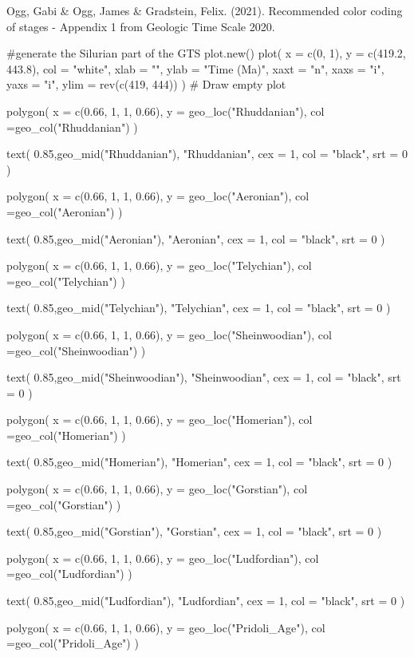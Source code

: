 \documentclass[a4paper]{book}
\begin{document}
%
\begin{References}
Ogg, Gabi \& Ogg, James \& Gradstein, Felix. (2021).
Recommended color coding of stages - Appendix 1
from Geologic Time Scale 2020.
\end{References}
%
\begin{Examples}
\begin{ExampleCode}
#generate the Silurian part of the GTS
plot.new()
plot(
 x = c(0, 1),
 y = c(419.2, 443.8),
 col = "white",
 xlab = "",
 ylab = "Time (Ma)",
 xaxt = "n",
 xaxs = "i",
 yaxs = "i",
 ylim = rev(c(419, 444))
)            # Draw empty plot

polygon(
 x = c(0.66, 1, 1, 0.66),
 y = geo_loc("Rhuddanian"),
 col =geo_col("Rhuddanian")
)

text(
 0.85,geo_mid("Rhuddanian"),
 "Rhuddanian",
 cex = 1,
 col = "black",
 srt = 0
)

polygon(
 x = c(0.66, 1, 1, 0.66),
 y = geo_loc("Aeronian"),
 col =geo_col("Aeronian")
)

text(
 0.85,geo_mid("Aeronian"),
 "Aeronian",
 cex = 1,
 col = "black",
 srt = 0
)

polygon(
 x = c(0.66, 1, 1, 0.66),
 y = geo_loc("Telychian"),
 col =geo_col("Telychian")
)

text(
 0.85,geo_mid("Telychian"),
 "Telychian",
 cex = 1,
 col = "black",
 srt = 0
)

polygon(
 x = c(0.66, 1, 1, 0.66),
 y = geo_loc("Sheinwoodian"),
 col =geo_col("Sheinwoodian")
)

text(
 0.85,geo_mid("Sheinwoodian"),
 "Sheinwoodian",
 cex = 1,
 col = "black",
 srt = 0
)


polygon(
 x = c(0.66, 1, 1, 0.66),
 y = geo_loc("Homerian"),
 col =geo_col("Homerian")
)

text(
 0.85,geo_mid("Homerian"),
 "Homerian",
 cex = 1,
 col = "black",
 srt = 0
)


polygon(
 x = c(0.66, 1, 1, 0.66),
 y = geo_loc("Gorstian"),
 col =geo_col("Gorstian")
)

text(
 0.85,geo_mid("Gorstian"),
 "Gorstian",
 cex = 1,
 col = "black",
 srt = 0
)

polygon(
 x = c(0.66, 1, 1, 0.66),
 y = geo_loc("Ludfordian"),
 col =geo_col("Ludfordian")
)

text(
 0.85,geo_mid("Ludfordian"),
 "Ludfordian",
 cex = 1,
 col = "black",
 srt = 0
)

polygon(
 x = c(0.66, 1, 1, 0.66),
 y = geo_loc("Pridoli_Age"),
 col =geo_col("Pridoli_Age")
)




\end{ExampleCode}
\end{Examples}
\end{document}

